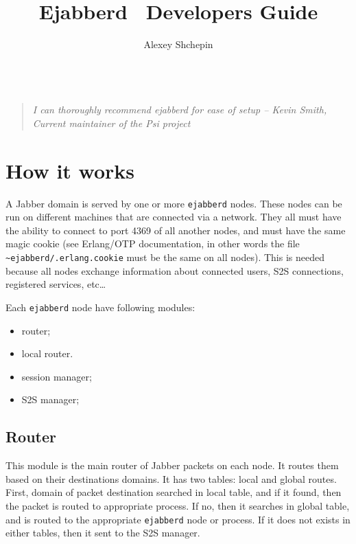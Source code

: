 \documentclass[a4paper,10pt]{article}
\title{Ejabberd \version\ Developers Guide}
\author{Alexey Shchepin \\
  \ahrefurl{mailto:alexey@sevcom.net} \\
  \ahrefurl{xmpp:aleksey@jabber.ru}}
\newcommand{\logoscale}{0.7}
\newcommand{\insscaleimg}[2]{
  \imgsrc{#2}{}
  \begin{latexonly}
    \scalebox{#1}{\texttt{[image: \#2]}}
  \end{latexonly}
}
\newcommand{\ejabberd}{\texttt{ejabberd}}
\newcommand{\Jabber}{Jabber}
\begin{document}
\label{sec:titlepage}
\begin{titlepage}
  \maketitle{}

  \begin{center}
  {\insscaleimg{\logoscale}{logo.png}
    \par
  }
  \end{center}

  \begin{quotation}\textit{I can thoroughly recommend ejabberd for ease of setup --
  Kevin Smith, Current maintainer of the Psi project}\end{quotation}

\end{titlepage}

\tableofcontents{}



\section{How it works}
\label{sec:howitworks}


A \Jabber{} domain is served by one or more \ejabberd{} nodes.  These nodes can
be run on different machines that are connected via a network.  They all must
have the ability to connect to port 4369 of all another nodes, and must have
the same magic cookie (see Erlang/OTP documentation, in other words the file
\texttt{\~{}ejabberd/.erlang.cookie} must be the same on all nodes). This is
needed because all nodes exchange information about connected users, S2S
connections, registered services, etc\ldots



Each \ejabberd{} node have following modules:
\begin{itemize}
\item router;
\item local router.
\item session manager;
\item S2S manager;
\end{itemize}


\subsection{Router}

This module is the main router of \Jabber{} packets on each node.  It routes
them based on their destinations domains.  It has two tables: local and global
routes.  First, domain of packet destination searched in local table, and if it
found, then the packet is routed to appropriate process.  If no, then it
searches in global table, and is routed to the appropriate \ejabberd{} node or
process.  If it does not exists in either tables, then it sent to the S2S
manager.
\end{document}
